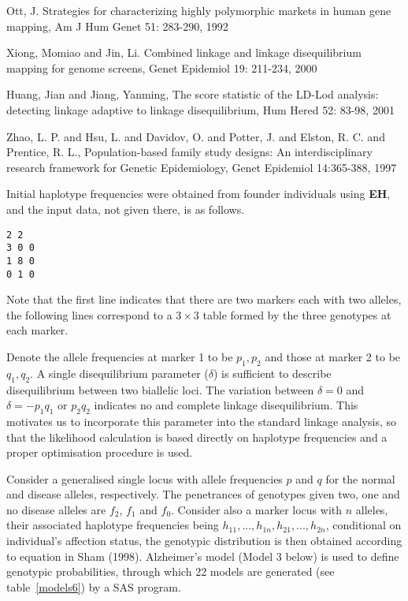 \documentclass[11pt]{article}
\begin{document}
\noindent Ott, J. Strategies for characterizing highly polymorphic markets in human gene mapping,
Am J Hum Genet 51: 283-290, 1992
   
\bigskip\noindent Xiong, Momiao and Jin, Li. Combined linkage and linkage disequilibrium mapping for genome
screens, Genet Epidemiol 19: 211-234, 2000

\bigskip\noindent Huang, Jian and Jiang, Yanming, The score statistic of the {LD-Lod} analysis: detecting
linkage adaptive to linkage disequilibrium, Hum Hered 52: 83-98, 2001

\bigskip\noindent Zhao, L. P. and Hsu, L. and Davidov, O. and Potter, J. and Elston, R. C. and Prentice, R.  
L., Population-based family study designs: An interdisciplinary research framework for Genetic Epidemiology,
Genet Epidemiol 14:365-388, 1997


\bigskip{}

\bigskip\noindent Initial haplotype frequencies were obtained from founder individuals using {\bf
EH}, and the input data, not given there, is as follows.
\begin{verbatim}
2 2
3 0 0
1 8 0
0 1 0
\end{verbatim}
Note that the first line indicates that there are two markers each with two
alleles, the following lines correspond to a $3\times 3$ table formed by the
three genotypes at each marker.

Denote the allele frequencies at marker 1 to be $p_1, p_2$ and those at marker
2 to be $q_1, q_2$.  A single disequilibrium parameter ($\delta$) is sufficient
to describe disequilibrium between two biallelic loci.  The variation between
$\delta=0$ and $\delta=-p_1q_1$ or $p_2q_2$ indicates no and complete linkage
disequilibrium.  This motivates us to incorporate this parameter into the
standard linkage analysis, so that the likelihood calculation is based directly
on haplotype frequencies and a proper optimisation procedure is used.

Consider a generalised single locus with allele frequencies $p$ and $q$ for the
normal and disease alleles, respectively. The penetrances of genotypes given
two, one and no disease alleles are $f_2$, $f_1$ and $f_0$.  Consider also a
marker locus with $n$ alleles, their associated haplotype frequencies being
$h_{11},...,h_{1n}, h_{21},...,h_{2n}$, conditional on individual's affection
status, the genotypic distribution is then obtained according to equation
in Sham (1998).  Alzheimer's model (Model 3 below) is used to define genotypic
probabilities, through which 22 models are generated (see table~\ref{models6})
by a SAS program.
\end{document}
